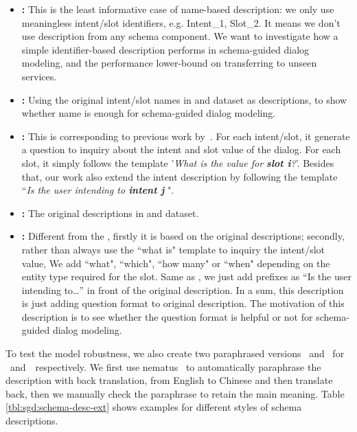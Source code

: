 \begin{itemize}
\item \textbf{\ID:} This is the least informative case of name-based
description: we only use meaningless intent/slot identifiers,
e.g. Intent\_1, Slot\_2. It means we don't use description from any
schema component. We want to investigate how a simple identifier-based
description performs in schema-guided dialog modeling, and the
performance lower-bound on transferring to unseen services.

\item \textbf{\NAMEONLY:} Using the original intent/slot names in \sgdst
and \multiwoz dataset as descriptions, to show whether name is enough
for schema-guided dialog modeling.

\item \textbf{\QANAMEONLY:} This is corresponding to previous
  work by~\citet{gao2019dialog}. For each intent/slot, it generate a
  question to inquiry about the intent and slot value of the
  dialog. For each slot, it simply follows the template '{\it What
    is the value for {\bf slot i}?}'. Besides that, our work also
  extend the intent description by following the template ``{\it Is
    the user intending to {\bf intent j} }".

 \item \textbf{\ORIGIN:} The original descriptions in \sgdst and \multiwoz dataset.

 \item \textbf{\QARICH:} Different from the \QANAMEONLY, firstly it is
  based on the original descriptions; secondly, rather than always use
  the ``what is" template to inquiry the intent/slot value, We add
  ``what", ``which", ``how many" or ``when" depending on the entity
  type required for the slot.  Same as \QANAMEONLY, we just add
  prefixes as ``Is the user intending to\ldots'' in front of the original
  description. In a sum, this description is just adding question
  format to original description. The motivation of this description is
  to see whether the question format is helpful or not for
  schema-guided dialog modeling.

\end{itemize}

To test the model robustness, we also create two paraphrased
  versions \textbf{\NAMEPARA}~and \textbf{\PARAPHRASE}~for
  \NAMEONLY~and~\ORIGIN~respectively. We first use
  nematus~\cite{sennrich-etal-2017-nematus} to automatically
  paraphrase the description with back translation, from English to
  Chinese and then translate back, then we manually check the
  paraphrase to retain the main meaning. Table
  \ref{tbl:sgd:schema-desc-ext} shows examples for different styles of
  schema descriptions.

